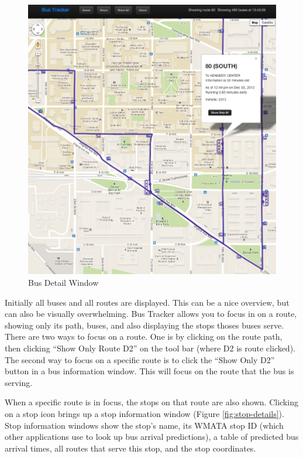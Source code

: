 \documentclass[12pt]{report}
\begin{document}
\begin{appendices}
\begin{figure}[ht]
  \centerline{\includegraphics[width=\textwidth]{bus-info-bubble.png}}
  \caption{Bus Detail Window}
  \label{fig:bus-details}
\end{figure}


Initially all buses and all routes are displayed.  This can be a nice overview, but can also be visually overwhelming.  Bus Tracker allows you to focus in on a route, showing only its path, buses, and also displaying the stops thoses buses serve.  There are two ways to focus on a route.  One is by clicking on the route path, then clicking ``Show Only Route D2'' on the tool bar (where D2 is route clicked).  The second way to focus on a specific route is to click the ``Show Only D2'' button in a bus information window.  This will focus on the route that the bus is serving.

When a specific route is in focus, the stops on that route are also shown.  Clicking on a stop icon brings up a stop information window (Figure \ref{fig:stop-details}).  Stop information windows show the stop's name, its WMATA stop ID (which other applications use to look up bus arrival predictions), a table of predicted bus arrival times, all routes that serve this stop, and the stop coordinates.


\end{appendices}
\end{document}
